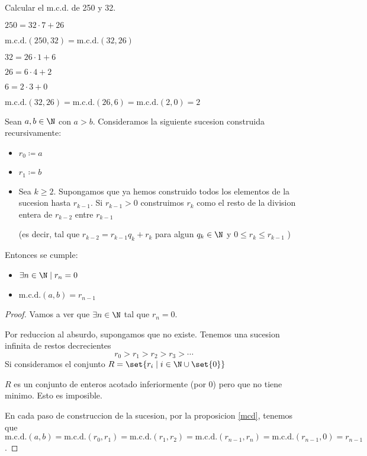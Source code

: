 \begin{example}
	Calcular el m.c.d. de 250 y 32.

	\(250 = 32 \cdot 7 + 26 \)

	\(\mathrm{m.c.d.}(250,32) = \mathrm{m.c.d.}(32,26)  \)

	\(32 = 26 \cdot 1 + 6 \)

	\(26 = 6 \cdot 4 + 2 \)

	\(6 = 2 \cdot 3 + 0\)

	\(\mathrm{m.c.d.}(32,26) = \mathrm{m.c.d.}(26,6) = \mathrm{m.c.d.}(2,0) = 2  \)
\end{example}

\begin{theorem}
	Sean \(a,b \in \N \) con \(a > b \). Consideramos la siguiente sucesion construida recursivamente:
	\begin{itemize}
		\item \(r_0 \coloneqq a \)
		\item \(r_1 \coloneqq b \)
		\item Sea \(k \geq 2 \). Supongamos que ya hemos construido todos los elementos de la sucesion hasta \(r_{k-1}.\) Si \(r_{k-1} > 0 \)  construimos \(r_k \) como el resto de la division entera de \(r_{k-2}\) entre \(r_{k-1}\)

		      (es decir, tal que \(r_{k-2} = r_{k-1}q_k + r_k \) para algun \(q_k \in \N \) y \(0 \leq r_k \leq  r_{k-1}\) )
	\end{itemize}
	Entonces se cumple:
	\begin{itemize}
		\item \(\exists  n \in \N \mid r_n = 0 \)
		\item \(\mathrm{m.c.d.}(a,b) = r_{n-1} \)
	\end{itemize}
\end{theorem}

\vspace{0.5cm}
\begin{proof}
	Vamos a ver que \(\exists n \in \N \) tal que \(r_n = 0 \).

	Por reduccion al absurdo, supongamos que no existe. Tenemos una sucesion infinita de restos decrecientes
	\[
		r_0 > r_1 > r_2 > r_3 > \cdots
	\]
	Si consideramos el conjunto \(R = \set{r_i \mid i \in \N \cup \set{0}}\)

	\(R \) es un conjunto de enteros acotado inferiormente (por 0) pero que no tiene minimo. Esto es imposible.

	En cada paso de construccion de la sucesion, por la proposicion \ref{mcd}, tenemos que \(\mathrm{m.c.d.}(a,b) = \mathrm{m.c.d.}(r_0,r_1) = \mathrm{m.c.d.}(r_1,r_2) = \mathrm{m.c.d.}(r_{n-1}, r_n ) = \mathrm{m.c.d.}(r_{n-1}, 0 ) = r_{n-1}\).
\end{proof}

